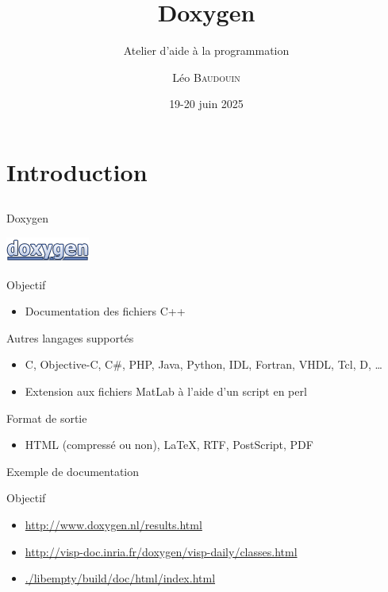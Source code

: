 \documentclass{beamer}
\title{Doxygen}
\subtitle{Atelier d'aide à la programmation}
\author{L\'eo \textsc{Baudouin}}
\institute{
  {\url{baudouin.leo @ gmail.com}}
}
\date{19-20 juin 2025}
\begin{document}
\begin{frame}
  \titlepage
\end{frame}

\section{Introduction}
\subsection{}

\begin{frame}{Doxygen}

\begin{center}
\includegraphics[width=0.3\linewidth]{images/doxygen-logo}
\end{center}

\begin{exampleblock}{Objectif}
\begin{itemize}
\item Documentation des fichiers C++
\end{itemize}
\end{exampleblock}

\begin{block}{Autres langages supportés}
\begin{itemize}
\item C, Objective-C, C\#, PHP, Java, Python, IDL, Fortran, VHDL, Tcl, D, \dots
\item Extension aux fichiers MatLab à l'aide d'un script en perl
\end{itemize}
\end{block}

\begin{block}{Format de sortie}
\begin{itemize}
\item HTML (compressé ou non), \LaTeX, RTF, PostScript, PDF
\end{itemize}
\end{block}
\end{frame}


\begin{frame}{Exemple de documentation}
\begin{block}{Objectif}
\begin{itemize}
\item \url{http://www.doxygen.nl/results.html}
\item \url{http://visp-doc.inria.fr/doxygen/visp-daily/classes.html}
\item \url{./libempty/build/doc/html/index.html}
\end{itemize}
\end{block}
\end{frame}
\end{document}

